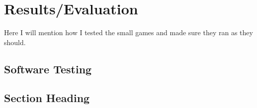 \chapter{Results/Evaluation}

Here I will mention how I tested the small games and made sure they ran as they should.

\section{Software Testing}

\section{Section Heading}
